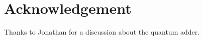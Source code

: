 \documentclass[10pt, a4paper]{article}
\begin{document}
{%
\section{Acknowledgement}

Thanks to Jonathan for a discussion about the quantum adder. 

}




\end{document}
